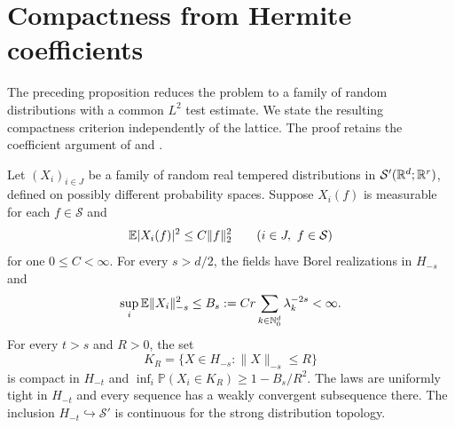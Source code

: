 \documentclass[11pt,letterpaper,reqno]{amsart}
\begin{document}
\section{Compactness from Hermite coefficients}\label{sec:compactness}
The preceding proposition reduces the problem to a family of
random distributions with a common $L^2$ test estimate. We state
the resulting compactness criterion independently of the lattice.
The proof retains the coefficient argument of
\cite[Section~5.4]{QED3Manuscript} and
\cite[Section~6.1]{LatticeLimits}.

\begin{proposition}\label{prop:compactness}
Let $(X_i)_{i\in J}$ be a family of random real tempered
distributions in $\mathcal S'(\mathbb R^d;\mathbb R^r)$, defined on possibly
different probability spaces. Suppose $X_i(f)$ is
measurable for each $f\in\mathcal S$ and
\begin{equation}\label{eq:distribution-second}
 \mathbb E|X_i(f)|^2\le C\|f\|_2^2
 \qquad(i\in J,\ f\in\mathcal S)
\end{equation}
for one $0\le C<\infty$. For every $s>d/2$, the fields have
Borel realizations in $H_{-s}$ and
\begin{equation}\label{eq:hermite-expectation}
 \sup_i\mathbb E\|X_i\|_{-s}^2\le
 B_s:=Cr\sum_{k\in\mathbb N_0^d}\lambda_k^{-2s}<\infty.
\end{equation}
For every $t>s$ and $R>0$, the set
\[
 K_R=\{X\in H_{-s}:\|X\|_{-s}\le R\}
\]
is compact in $H_{-t}$ and
$\inf_i\mathbb P(X_i\in K_R)\ge1-B_s/R^2$.
The laws are uniformly tight in $H_{-t}$ and every sequence has
a weakly convergent subsequence there. The inclusion
$H_{-t}\hookrightarrow\mathcal S'$ is continuous for the strong
distribution topology.
\end{proposition}
\end{document}
